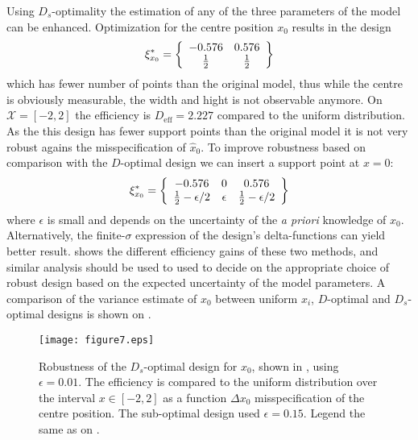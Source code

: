 \documentclass[12pt]{iopart}
\begin{document}
Using $D_s$-optimality the estimation of any of the three parameters of the model  can be enhanced. Optimization for the centre position $x_0$ results in the design
\begin{equation}
\xi^*_{x_0} = \left\{
  \begin{array}{c c}
    -0.576 & 0.576 \\
    \frac{1}{2} & \frac{1}{2}\\
  \end{array} \right \}
\end{equation}
which has fewer number of points than the original model, thus while the centre is obviously measurable, the width and hight is not observable anymore.  On $\mathcal{X} = [-2,2]$ the efficiency is $D_\mathrm{eff} = 2.227$ compared to the uniform distribution. As the this design has fewer support points than the original model it is not very robust agains the misspecification of $\hat x_0$. To improve robustness based on comparison with the $D$-optimal design we can insert a support point at $x=0$:
\begin{equation}
\xi^*_{x_0} = \left\{
  \begin{array}{c c c}
    -0.576 & 0 & 0.576 \\
    \frac{1}{2}-\epsilon/2 & \epsilon & \frac{1}{2}-\epsilon/2\\
  \end{array} \right \}
\label{eq:dsx0robust}
\end{equation}
where $\epsilon$ is small and depends on the uncertainty of the \textit{a priori} knowledge of $x_0$. Alternatively, the finite-$\sigma$ expression of the design's delta-functions can yield better result.  shows the different efficiency gains of these two methods, and similar analysis should be used to used to decide on the appropriate choice of robust design based on the expected uncertainty of the model parameters. A comparison of the variance estimate of $x_0$ between uniform $x_i$, $D$-optimal and $D_s$-optimal designs is shown on .

\begin{figure}
\texttt{[image: figure7.eps]}
\caption{Robustness of the $D_s$-optimal design for $x_0$, shown in , using $\epsilon = 0.01$. The efficiency is compared to the uniform distribution over the interval $x\in [-2,2]$ as a function $\Delta x_0$ misspecification of the centre position. The sub-optimal design used $\epsilon = 0.15$. Legend the same as on .}
\label{fig:dsx0robust}
\end{figure}
\end{document}
